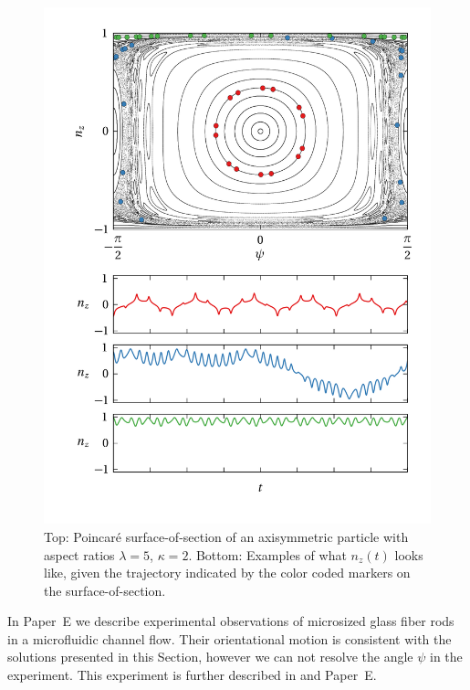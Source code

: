 \documentclass[thesis.tex]{subfiles}
\begin{document}
\begin{figure}
\centering
\includegraphics[width=12cm]{figs/poincare2o00.png}%
\caption{\label{fig:poincare2o00} Top: Poincar\'e surface-of-section of an axisymmetric particle with aspect ratios $\lambda=5$, $\kappa=2$. Bottom: Examples of what $n_z(t)$ looks like, given the trajectory indicated by the color coded markers on the surface-of-section. 
}
\end{figure}

In Paper~E we describe experimental observations of microsized glass fiber rods in a microfluidic channel flow. Their orientational motion is consistent with the solutions presented in this Section, however we can not resolve the angle $\psi$ in the experiment. This experiment is further described in  and Paper~E.
\end{document}
